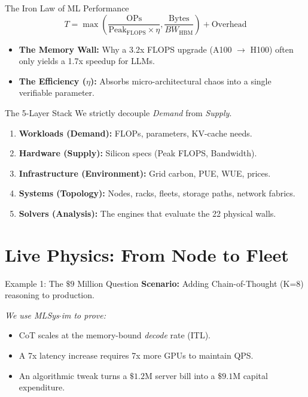 \documentclass[aspectratio=169, 10pt]{beamer}
\begin{document}
\begin{frame}{The Iron Law of ML Performance}
    \centering
    \Large
    $$ T = \max\left( \frac{\text{OPs}}{\text{Peak}_{\text{FLOPS}} \times \eta}, \frac{\text{Bytes}}{BW_{\text{HBM}}} \right) + \text{Overhead} $$
    \vspace{0.5cm}
    
    
    \normalsize
    \begin{itemize}
        \item \textbf{The Memory Wall:} Why a 3.2x FLOPS upgrade (A100 $\rightarrow$ H100) often only yields a 1.7x speedup for LLMs.
        \item \textbf{The Efficiency ($\eta$):} Absorbs micro-architectural chaos into a single verifiable parameter.
    \end{itemize}
\end{frame}

\begin{frame}{The 5-Layer Stack}
    We strictly decouple \emph{Demand} from \emph{Supply}.
    \vspace{0.3cm}
    
    \begin{enumerate}
        \item \textbf{Workloads (Demand):} FLOPs, parameters, KV-cache needs.
        \item \textbf{Hardware (Supply):} Silicon specs (Peak FLOPS, Bandwidth).
        \item \textbf{Infrastructure (Environment):} Grid carbon, PUE, WUE, prices.
        \item \textbf{Systems (Topology):} Nodes, racks, fleets, storage paths, network fabrics.
        \item \textbf{Solvers (Analysis):} The engines that evaluate the 22 physical walls.
    \end{enumerate}
\end{frame}

\section{Live Physics: From Node to Fleet}

\begin{frame}{Example 1: The $\$9$ Million Question}
    \textbf{Scenario:} Adding Chain-of-Thought (K=8) reasoning to production.
    
    \vspace{0.3cm}
    \textit{We use MLSys$\cdot$im to prove:}
    \begin{itemize}
        \item CoT scales at the memory-bound \emph{decode} rate (ITL).
        \item A 7x latency increase requires 7x more GPUs to maintain QPS.
        \item An algorithmic tweak turns a $\$1.2$M server bill into a $\$9.1$M capital expenditure.
    \end{itemize}
\end{frame}
\end{document}
